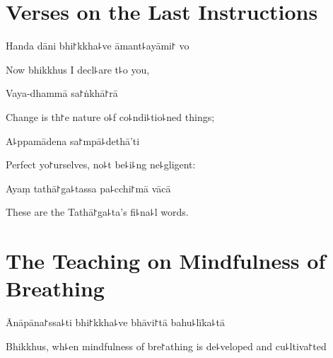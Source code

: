 \chapter{Verses on the Last Instructions}%



\begin{leader}
\end{leader}

Handa dāni bhi꜓kkha꜕ve āmant꜕ayāmi꜓ vo

\begin{english}
  Now bhikkhus I decl꜕are t꜕o you,
\end{english}

Vaya-dhammā sa꜓ṅkhā꜓rā

\begin{english}
  Change is th꜓e nature o꜕f co꜕ndi꜕tio꜕ned things;
\end{english}

A꜕ppamādena sa꜓mpā꜕dethā'ti


\begin{english}
  Perfect yo꜓urselves, no꜕t be꜕i꜕ng ne꜕gligent:
\end{english}

Ayaṃ tathā꜓ga꜕tassa pa꜕cchi꜓mā vācā

\begin{english}
  These are the Tathā꜓ga꜕ta's fi꜕na꜕l words.
\end{english}

\chapter{The Teaching on Mindfulness of Breathing}%



\begin{leader}
\end{leader}

Ānāpāna꜓ssa꜕ti bhi꜓kkha꜕ve bhāvi꜓tā bahu꜕līka꜕tā

\begin{english}
  Bhikkhus, wh꜕en mindfulness of bre꜓athing is de꜕veloped and cu꜕ltiva꜓ted
\end{english}


